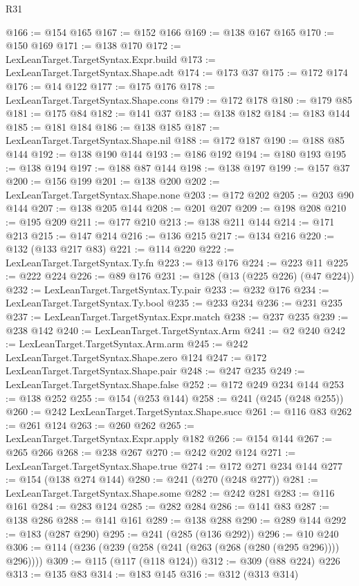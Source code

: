 \begin{lexlean}{R31}
\begin{coremodule}
@166 := @154 @165
@167 := @152 @166
@169 := @138 @167 @165
@170 := @150 @169
@171 := @138 @170
@172 := LexLeanTarget.TargetSyntax.Expr.build
@173 := LexLeanTarget.TargetSyntax.Shape.adt
@174 := @173 @37
@175 := @172 @174
@176 := @14 @122
@177 := @175 @176
@178 := LexLeanTarget.TargetSyntax.Shape.cons
@179 := @172 @178
@180 := @179 @85
@181 := @175 @84
@182 := @141 @37
@183 := @138 @182
@184 := @183 @144
@185 := @181 @184
@186 := @138 @185
@187 := LexLeanTarget.TargetSyntax.Shape.nil
@188 := @172 @187
@190 := @188 @85 @144
@192 := @138 @190 @144
@193 := @186 @192
@194 := @180 @193
@195 := @138 @194
@197 := @188 @87 @144
@198 := @138 @197
@199 := @157 @37
@200 := @156 @199
@201 := @138 @200
@202 := LexLeanTarget.TargetSyntax.Shape.none
@203 := @172 @202
@205 := @203 @90 @144
@207 := @138 @205 @144
@208 := @201 @207
@209 := @198 @208
@210 := @195 @209
@211 := @177 @210
@213 := @138 @211 @144
@214 := @171 @213
@215 := @147 @214
@216 := @136 @215
@217 := @134 @216
@220 := @132 (@133 @217 @83)
@221 := @114 @220
@222 := LexLeanTarget.TargetSyntax.Ty.fn
@223 := @13 @176
@224 := @223 @11
@225 := @222 @224
@226 := @89 @176
@231 := @128 (@13 (@225 @226) (@47 @224))
@232 := LexLeanTarget.TargetSyntax.Ty.pair
@233 := @232 @176
@234 := LexLeanTarget.TargetSyntax.Ty.bool
@235 := @233 @234
@236 := @231 @235
@237 := LexLeanTarget.TargetSyntax.Expr.match
@238 := @237 @235
@239 := @238 @142
@240 := LexLeanTarget.TargetSyntax.Arm
@241 := @2 @240
@242 := LexLeanTarget.TargetSyntax.Arm.arm
@245 := @242 LexLeanTarget.TargetSyntax.Shape.zero @124
@247 := @172 LexLeanTarget.TargetSyntax.Shape.pair
@248 := @247 @235
@249 := LexLeanTarget.TargetSyntax.Shape.false
@252 := @172 @249 @234 @144
@253 := @138 @252
@255 := @154 (@253 @144)
@258 := @241 (@245 (@248 @255))
@260 := @242 LexLeanTarget.TargetSyntax.Shape.succ
@261 := @116 @83
@262 := @261 @124
@263 := @260 @262
@265 := LexLeanTarget.TargetSyntax.Expr.apply @182
@266 := @154 @144
@267 := @265 @266
@268 := @238 @267
@270 := @242 @202 @124
@271 := LexLeanTarget.TargetSyntax.Shape.true
@274 := @172 @271 @234 @144
@277 := @154 (@138 @274 @144)
@280 := @241 (@270 (@248 @277))
@281 := LexLeanTarget.TargetSyntax.Shape.some
@282 := @242 @281
@283 := @116 @161
@284 := @283 @124
@285 := @282 @284
@286 := @141 @83
@287 := @138 @286
@288 := @141 @161
@289 := @138 @288
@290 := @289 @144
@292 := @183 (@287 @290)
@295 := @241 (@285 (@136 @292))
@296 := @10 @240
@306 := @114 (@236 (@239 (@258 (@241 (@263 (@268 (@280 (@295 @296)))) @296))))
@309 := @115 (@117 (@118 @124))
@312 := @309 (@88 @224) @226
@313 := @135 @83
@314 := @183 @145
@316 := @312 (@313 @314)

\end{coremodule}
\end{lexlean}

